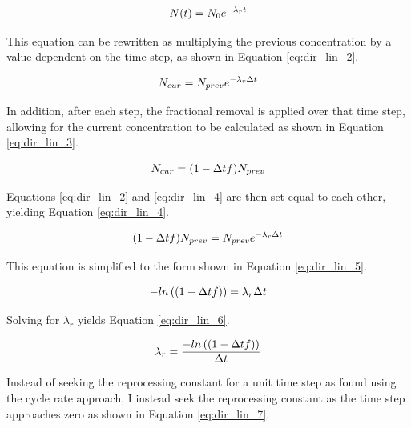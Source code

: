 
\begin{equation} \hfill
N(t) = N_0 e^{-\lambda_r t}
\hfill\label{eq:dir_lin_1_2} \end{equation}

This equation can be rewritten as multiplying the previous concentration by a value dependent on the time step, as shown in Equation \eqref{eq:dir_lin_2}.

\begin{equation} \hfill
N_{cur} = N_{prev} e^{-\lambda_r \Delta t}
\hfill\label{eq:dir_lin_2} \end{equation}

In addition, after each step, the fractional removal is applied over that time step, allowing for the current concentration to be calculated as shown in Equation \eqref{eq:dir_lin_3}.

\begin{equation} \hfill
N_{cur} = (1 - \Delta t f) N_{prev}
\hfill\label{eq:dir_lin_3} \end{equation}

Equations \eqref{eq:dir_lin_2} and \eqref{eq:dir_lin_4} are then set equal to each other, yielding Equation \eqref{eq:dir_lin_4}.

\begin{equation} \hfill
(1 - \Delta t f) N_{prev} = N_{prev} e^{-\lambda_r \Delta t}
\hfill\label{eq:dir_lin_4} \end{equation}

This equation is simplified to the form shown in Equation \eqref{eq:dir_lin_5}.

\begin{equation} \hfill
-ln\left((1 - \Delta t f)\right) = \lambda_r \Delta t
\hfill\label{eq:dir_lin_5} \end{equation}

Solving for $\lambda_r$ yields Equation \eqref{eq:dir_lin_6}.

\begin{equation} \hfill
\lambda_r = \frac{-ln\left((1 - \Delta t f)\right)}{\Delta t}
\hfill\label{eq:dir_lin_6} \end{equation}

Instead of seeking the reprocessing constant for a unit time step as found using the cycle rate approach, I instead seek the reprocessing constant as the time step approaches zero as shown in Equation \eqref{eq:dir_lin_7}.

